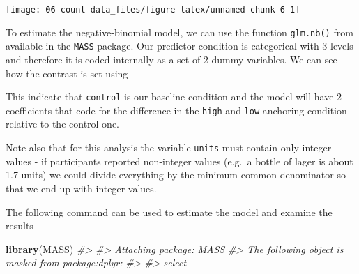 \documentclass[
]{book}
\newenvironment{Shaded}{\begin{snugshade}}{\end{snugshade}}
\newcommand{\CommentTok}[1]{\textcolor[rgb]{0.56,0.35,0.01}{\textit{#1}}}
\newcommand{\FunctionTok}[1]{\textcolor[rgb]{0.13,0.29,0.53}{\textbf{#1}}}
\newcommand{\NormalTok}[1]{#1}
\newcommand{\OtherTok}[1]{\textcolor[rgb]{0.56,0.35,0.01}{#1}}
\newcommand{\SpecialCharTok}[1]{\textcolor[rgb]{0.81,0.36,0.00}{\textbf{#1}}}
\begin{document}
\begin{center}\texttt{[image: 06-count-data\_files/figure-latex/unnamed-chunk-6-1]} \end{center}

To estimate the negative-binomial model, we can use the function \texttt{glm.nb()} from available in the \texttt{MASS} package. Our predictor condition is categorical with 3 levels and therefore it is coded internally as a set of 2 dummy variables. We can see how the contrast is set using

\begin{Shaded}
\end{Shaded}

This indicate that \texttt{control} is our baseline condition and the model will have 2 coefficients that code for the difference in the \texttt{high} and \texttt{low} anchoring condition relative to the control one.

Note also that for this analysis the variable \texttt{units} must contain only integer values - if participants reported non-integer values (e.g.~a bottle of lager is about 1.7 units) we could divide everything by the minimum common denominator so that we end up with integer values.

The following command can be used to estimate the model and examine the results

\begin{Shaded}
\begin{Highlighting}[]
\FunctionTok{library}\NormalTok{(MASS)}
\CommentTok{\#\textgreater{} }
\CommentTok{\#\textgreater{} Attaching package: \textquotesingle{}MASS\textquotesingle{}}
\CommentTok{\#\textgreater{} The following object is masked from \textquotesingle{}package:dplyr\textquotesingle{}:}
\CommentTok{\#\textgreater{} }
\CommentTok{\#\textgreater{}     select}
\end{Highlighting}
\end{Shaded}
\end{document}
